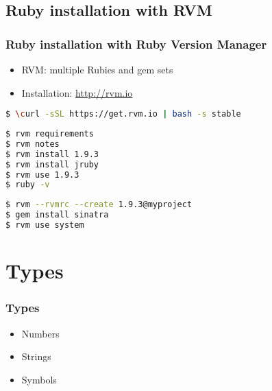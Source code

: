 \subsection{Ruby installation with RVM}
\begin{frame}[fragile]\frametitle{Ruby installation with Ruby Version Manager}

\begin{itemize}
  \item RVM: multiple Rubies and gem sets
  \item Installation: \href{http://rvm.io}{http://rvm.io}
\end{itemize}
\pause
\begin{lstlisting}[language=bash, escapechar={^}]
$ \curl -sSL https://get.rvm.io | bash -s stable
\end{lstlisting}
\pause
\begin{lstlisting}[language=bash, escapechar={^}]
$ rvm requirements
$ rvm notes
$ rvm install 1.9.3
$ rvm install jruby
$ rvm use 1.9.3
$ ruby -v
\end{lstlisting}
\pause
\begin{lstlisting}[language=bash, escapechar={^}]
$ rvm --rvmrc --create 1.9.3@myproject
$ gem install sinatra
$ rvm use system
\end{lstlisting}

\end{frame}




\section{Types} 
\begin{frame}\frametitle{Types} 
\begin{itemize}
\item Numbers
\item Strings
\item Symbols
\end{itemize}
\end{frame}




